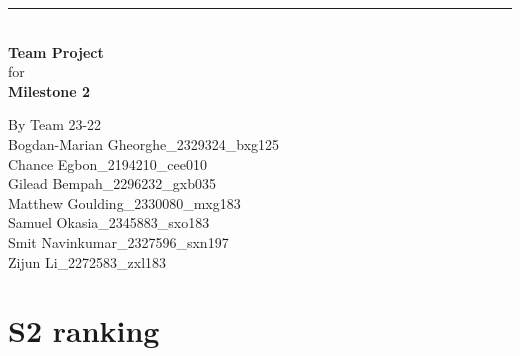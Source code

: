 \documentclass[a4paper]{article}
\begin{document}

\begin{titlepage}
	
	\rule{\linewidth}{5pt}
	\raggedleft
	\fontsize{38pt}{50pt}\selectfont
    \textbf{\\Team Project\\}
    \fontsize{28pt}{60pt}\selectfont 
    for\\
    \fontsize{38pt}{60pt}\selectfont 
    \textbf{Milestone 2\\}
	
	\vfill %
	
	
	\parbox[t]{0.93\textwidth}{ %
		\raggedleft %
		\large %
		{\Large By Team 23-22}\\[4pt] %
		Bogdan-Marian Gheorghe\_2329324\_bxg125\\
		Chance Egbon\_2194210\_cee010\\
		Gilead Bempah\_2296232\_gxb035\\
		Matthew Goulding\_2330080\_mxg183\\
		Samuel Okasia\_2345883\_sxo183\\
		Smit Navinkumar\_2327596\_sxn197\\
		Zijun Li\_2272583\_zxl183\\
	}
	
\end{titlepage}

\begin{center}
	\tableofcontents
\end{center}
\newpage

\section{S2 ranking}
\end{document}
